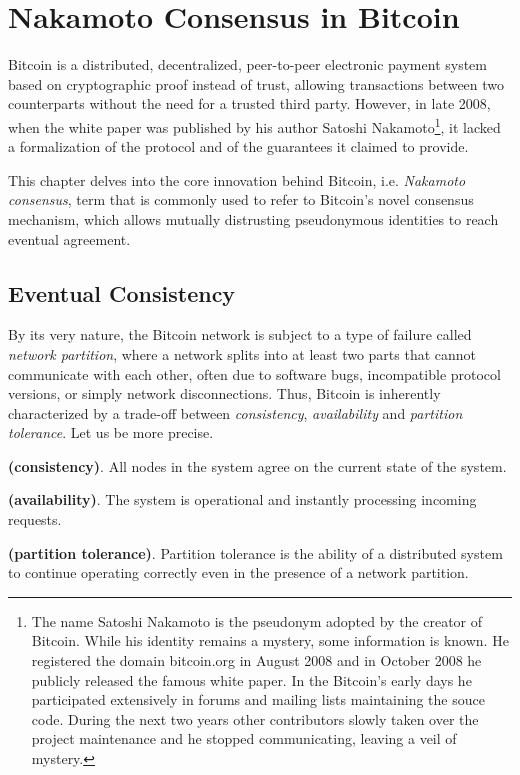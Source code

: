 \chapter{Nakamoto Consensus in Bitcoin}
\label{chpr:btc}
Bitcoin is a distributed, decentralized, peer-to-peer electronic payment system based on cryptographic proof instead of trust, allowing transactions between two counterparts without the need for a trusted third party. However, in late 2008, when the white paper was published by his author Satoshi Nakamoto\footnote{The name Satoshi Nakamoto is the pseudonym adopted by the creator of Bitcoin. While his identity remains a mystery, some information is known. He registered the domain bitcoin.org in August 2008 and in October 2008 he publicly released the famous white paper. In the Bitcoin's early days he participated extensively in forums and mailing lists maintaining the souce code. During the next two years other contributors slowly taken over the project maintenance and he stopped communicating, leaving a veil of mystery.}, it lacked a formalization of the protocol and of the guarantees it claimed to provide.

\bigskip
\noindent
This chapter delves into the core innovation behind Bitcoin, i.e. \textit{Nakamoto consensus}, term that is commonly used to refer to Bitcoin's novel consensus mechanism, which allows mutually distrusting pseudonymous identities to reach eventual agreement.

\bigskip
\section{Eventual Consistency}
By its very nature, the Bitcoin network is subject to a type of failure called \textit{network partition}, where a network splits into at least two parts that cannot communicate with each other, often due to software bugs, incompatible protocol versions, or simply network disconnections.
Thus, Bitcoin is inherently characterized by a trade-off between \textit{consistency}, \textit{availability} and \textit{partition tolerance}. Let us be more precise.
\begin{mydef} {\bf (consistency)}.
    All nodes in the system agree on the current state of the system.
\end{mydef}
\begin{mydef} {\bf (availability)}.
    The system is operational and instantly processing incoming requests.
\end{mydef}
\begin{mydef} {\bf (partition tolerance)}.
    Partition tolerance is the ability of a distributed system to continue operating correctly even in the presence of a network partition.
\end{mydef}

